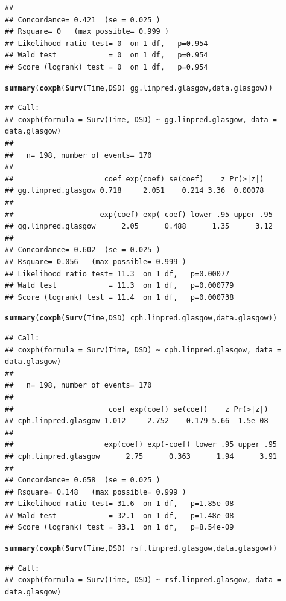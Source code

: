 \documentclass{article}\usepackage[]{graphicx}\usepackage[]{color}
\makeatletter
\newcommand{\hlopt}[1]{\textcolor[rgb]{0,0,0}{#1}}%
\newcommand{\hlstd}[1]{\textcolor[rgb]{0.345,0.345,0.345}{#1}}%
\newcommand{\hlkwd}[1]{\textcolor[rgb]{0.737,0.353,0.396}{\textbf{#1}}}%
\newenvironment{kframe}{%
 \def\at@end@of@kframe{}%
 \ifinner\ifhmode%
  \def\at@end@of@kframe{\end{minipage}}%
  \begin{minipage}{\columnwidth}%
 \fi\fi%
 \def\FrameCommand##1{\hskip\@totalleftmargin \hskip-\fboxsep
 \colorbox{shadecolor}{##1}\hskip-\fboxsep
     \hskip-\linewidth \hskip-\@totalleftmargin \hskip\columnwidth}%
 \MakeFramed {\advance\hsize-\width
   \@totalleftmargin\z@ \linewidth\hsize
   \@setminipage}}%
 {\par\unskip\endMakeFramed%
 \at@end@of@kframe}
\newenvironment{knitrout}{}{} %
\makeatother
\begin{document}
\begin{knitrout}
\begin{kframe}
\begin{verbatim}
## 
## Concordance= 0.421  (se = 0.025 )
## Rsquare= 0   (max possible= 0.999 )
## Likelihood ratio test= 0  on 1 df,   p=0.954
## Wald test            = 0  on 1 df,   p=0.954
## Score (logrank) test = 0  on 1 df,   p=0.954
\end{verbatim}
\begin{alltt}
\hlkwd{summary}\hlstd{(}\hlkwd{coxph}\hlstd{(}\hlkwd{Surv}\hlstd{(Time, DSD)} \hlopt{~} \hlstd{gg.linpred.glasgow, data.glasgow))}
\end{alltt}
\begin{verbatim}
## Call:
## coxph(formula = Surv(Time, DSD) ~ gg.linpred.glasgow, data = data.glasgow)
## 
##   n= 198, number of events= 170 
## 
##                     coef exp(coef) se(coef)    z Pr(>|z|)
## gg.linpred.glasgow 0.718     2.051    0.214 3.36  0.00078
## 
##                    exp(coef) exp(-coef) lower .95 upper .95
## gg.linpred.glasgow      2.05      0.488      1.35      3.12
## 
## Concordance= 0.602  (se = 0.025 )
## Rsquare= 0.056   (max possible= 0.999 )
## Likelihood ratio test= 11.3  on 1 df,   p=0.00077
## Wald test            = 11.3  on 1 df,   p=0.000779
## Score (logrank) test = 11.4  on 1 df,   p=0.000738
\end{verbatim}
\begin{alltt}
\hlkwd{summary}\hlstd{(}\hlkwd{coxph}\hlstd{(}\hlkwd{Surv}\hlstd{(Time, DSD)} \hlopt{~} \hlstd{cph.linpred.glasgow, data.glasgow))}
\end{alltt}
\begin{verbatim}
## Call:
## coxph(formula = Surv(Time, DSD) ~ cph.linpred.glasgow, data = data.glasgow)
## 
##   n= 198, number of events= 170 
## 
##                      coef exp(coef) se(coef)    z Pr(>|z|)
## cph.linpred.glasgow 1.012     2.752    0.179 5.66  1.5e-08
## 
##                     exp(coef) exp(-coef) lower .95 upper .95
## cph.linpred.glasgow      2.75      0.363      1.94      3.91
## 
## Concordance= 0.658  (se = 0.025 )
## Rsquare= 0.148   (max possible= 0.999 )
## Likelihood ratio test= 31.6  on 1 df,   p=1.85e-08
## Wald test            = 32.1  on 1 df,   p=1.48e-08
## Score (logrank) test = 33.1  on 1 df,   p=8.54e-09
\end{verbatim}
\begin{alltt}
\hlkwd{summary}\hlstd{(}\hlkwd{coxph}\hlstd{(}\hlkwd{Surv}\hlstd{(Time, DSD)} \hlopt{~} \hlstd{rsf.linpred.glasgow, data.glasgow))}
\end{alltt}
\begin{verbatim}
## Call:
## coxph(formula = Surv(Time, DSD) ~ rsf.linpred.glasgow, data = data.glasgow)

\end{verbatim}
\end{kframe}
\end{knitrout}
\end{document}
